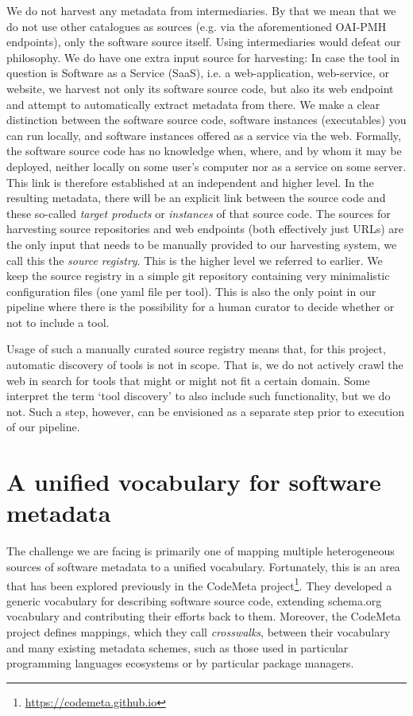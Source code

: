 \documentclass[a4paper,11pt]{article}
\begin{document}
We do not harvest any metadata from intermediaries. By that we mean that we do
not use other catalogues as sources (e.g. via the aforementioned OAI-PMH
endpoints), only the software source itself. Using intermediaries would defeat
our philosophy. We do have one extra input source for harvesting: In case the
tool in question is Software as a Service (SaaS), i.e. a web-application,
web-service, or website, we harvest not only its software source code, but also
its web endpoint and attempt to automatically extract metadata from there. We
make a clear distinction between the software source code, software instances
(executables) you can run locally, and software instances offered as a service
via the web. Formally, the software source code has no knowledge when, where,
and by whom it may be deployed, neither locally on some user's computer nor as
a service on some server. This link is therefore established at an independent
and higher level. In the resulting metadata, there will be an explicit
link between the source code and these so-called \emph{target products} or \emph{instances}
of that source code. The sources for harvesting source repositories and web
endpoints (both effectively just URLs) are the only input that needs to be
manually provided to our harvesting system, we call this the \emph{source registry}. This
is the higher level we referred to earlier. We keep the source registry in a
simple git repository containing very minimalistic configuration files (one
yaml file per tool). This is also the only point in our pipeline where there is
the possibility for a human curator to decide whether or not to include a tool.

Usage of such a manually curated source registry means that, for this project,
automatic discovery of tools is not in scope. That is, we do not actively crawl
the web in search for tools that might or might not fit a certain domain. Some
interpret the term `tool discovery' to also include such functionality, but we
do not. Such a step, however, can be envisioned as a separate step prior to
execution of our pipeline.

\section{A unified vocabulary for software metadata}

The challenge we are facing is primarily one of mapping multiple heterogeneous
sources of software metadata to a unified vocabulary. Fortunately, this is an
area that has been explored previously in the CodeMeta
project\footnote{\url{https://codemeta.github.io}}. They developed a generic
vocabulary for describing software source code, extending schema.org vocabulary
and contributing their efforts back to them. Moreover, the CodeMeta project
defines mappings, which they call \emph{crosswalks}, between their vocabulary and many existing
metadata schemes, such as those used in particular programming languages
ecosystems or by particular package managers.
\end{document}
